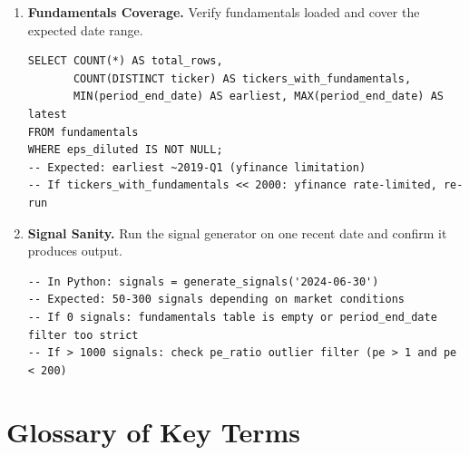 \documentclass[11pt, oneside]{book}
\begin{document}
\begin{enumerate}[leftmargin=*, label=\textbf{Check \arabic*.}]
    \item \textbf{Fundamentals Coverage.} Verify fundamentals loaded and cover the expected date range.
    \begin{lstlisting}[style=sqlstyle]
SELECT COUNT(*) AS total_rows,
       COUNT(DISTINCT ticker) AS tickers_with_fundamentals,
       MIN(period_end_date) AS earliest, MAX(period_end_date) AS latest
FROM fundamentals
WHERE eps_diluted IS NOT NULL;
-- Expected: earliest ~2019-Q1 (yfinance limitation)
-- If tickers_with_fundamentals << 2000: yfinance rate-limited, re-run
    \end{lstlisting}

    \item \textbf{Signal Sanity.} Run the signal generator on one recent date and confirm it produces output.
    \begin{lstlisting}[style=sqlstyle]
-- In Python: signals = generate_signals('2024-06-30')
-- Expected: 50-300 signals depending on market conditions
-- If 0 signals: fundamentals table is empty or period_end_date filter too strict
-- If > 1000 signals: check pe_ratio outlier filter (pe > 1 and pe < 200)
    \end{lstlisting}
\end{enumerate}

\chapter{Glossary of Key Terms}
\end{document}
